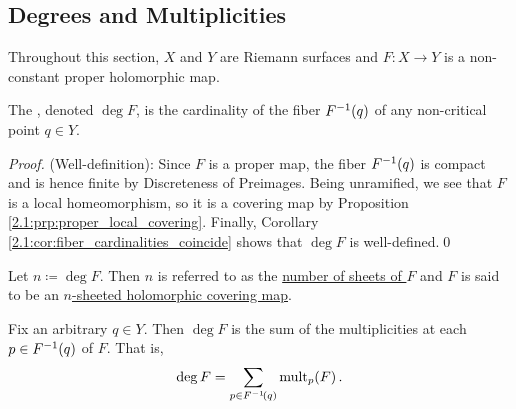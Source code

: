 \documentclass[../Moduli_Spaces_of_Riemann_Surfaces.tex]{subfiles}
\begin{document}
    \subsection{Degrees and Multiplicities}
    Throughout this section, $X$ and $Y$ are Riemann surfaces and $F:X\to Y$ is a non-constant proper holomorphic map.
    \begin{definition}
        The , denoted $\deg F$, is the cardinality of the fiber $F^{-1}\!\left(q\right)$ of any non-critical point $q\in Y$.
    \end{definition}
    \begin{proof}
        (Well-definition): Since $F$ is a proper map, the fiber $F^{-1}\!\left(q\right)$ is compact and is hence finite by Discreteness of Preimages. Being unramified, we see that $F$ is a local homeomorphism, so it is a covering map by Proposition \ref{2.1:prp:proper_local_covering}. Finally, Corollary \ref{2.1:cor:fiber_cardinalities_coincide} shows that $\deg F$ is well-defined.\qed
    \end{proof}
    \begin{remark}
        Let $n\coloneqq\deg F$. Then $n$ is referred to as the \ul{number of sheets of $F$} and $F$ is said to be an \ul{$n$-sheeted holomorphic covering map}.\exqed
    \end{remark}
    \begin{theorem}
        Fix an arbitrary $q\in Y$. Then $\deg F$ is the sum of the multiplicities at each $p\in F^{-1}\!\left(q\right)$ of $F$. That is,
        \begin{equation*}
            \deg F=\sum_{p\in F^{-1}\!\left(q\right)}\operatorname{mult}_p\!\left(F\right).
        \end{equation*}
    \end{theorem}
    \vspace{-0.1in}
\end{document}

